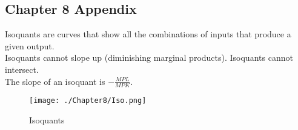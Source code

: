 \subsection*{Chapter 8 Appendix}
Isoquants are curves that show all the combinations of inputs that produce a given output.\\
Isoquants cannot slope up (diminishing marginal products). Isoquants cannot intersect.\\
The slope of an isoquant is $-\frac{MPL}{MPK}$.
\begin{figure}[H]
    \centering
    \texttt{[image: ./Chapter8/Iso.png]}
    \caption{Isoquants}
\end{figure}